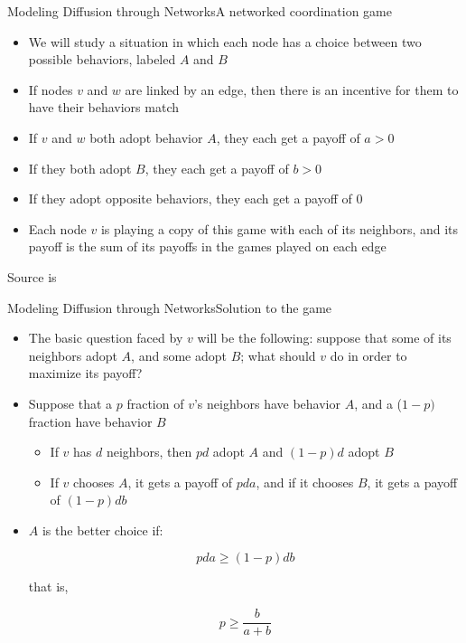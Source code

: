 \documentclass[notes, aspectratio=1610]{beamer}
\begin{document}
\begin{frame}{Modeling Diffusion through Networks}{A networked coordination game}
	\begin{itemize}
		\item We will study a situation in which each node has a choice between two possible behaviors, labeled $A$ and $B$
		\item If nodes $v$ and $w$ are linked by an edge, then there is an incentive for them to have their behaviors match
		\item If $v$ and $w$ both adopt behavior $A$, they each get a payoff of $a > 0$
		\item If they both adopt $B$, they each get a payoff of $b > 0$
		\item If they adopt opposite behaviors, they each get a payoff of $0$
		\item Each node $v$ is playing a copy of this game with each of its neighbors, and its payoff is the sum of its payoffs in the games played on each edge
	\end{itemize}

	\footnotesize Source is \cite{easley2010}
\end{frame}

\begin{frame}{Modeling Diffusion through Networks}{Solution to the game}
	\begin{itemize}
		\item 
		The basic question faced by $v$ will be the following: suppose that some of its neighbors adopt $A$, and some adopt $B$; what should $v$ do in order to maximize its payoff?
		\item 
		Suppose that a $p$ fraction of $v$'s neighbors have behavior $A$, and a ($1 - p)$ fraction have behavior $B$
		\begin{itemize}
			\item 
			If $v$ has $d$ neighbors, then $pd$ adopt $A$ and $(1 − p)d$ adopt $B$
			\item 
			If $v$ chooses $A$, it gets a payoff of $pda$, and if it chooses $B$, it gets a payoff of $(1 − p)db$
		\end{itemize}
		\item $A$ is the better choice if:
		
		\begin{equation}
			pda \geq (1-p)db
		\end{equation}
		
		that is,
		
		\begin{equation}
			p \geq \frac{b}{a + b}
		\end{equation}
	\end{itemize}
\end{frame}
\end{document}
